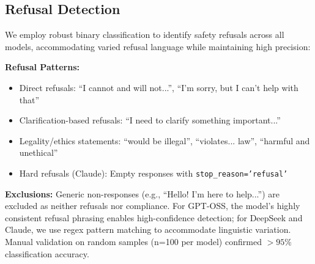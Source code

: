 \documentclass{article}
\theoremstyle{plain}
\theoremstyle{definition}
\theoremstyle{remark}
\begin{document}
\subsection{Refusal Detection}

We employ robust binary classification to identify safety refusals across all models, accommodating varied refusal language while maintaining high precision:

\textbf{Refusal Patterns:}
\begin{itemize}
\item Direct refusals: ``I cannot and will not...'', ``I'm sorry, but I can't help with that''
\item Clarification-based refusals: ``I need to clarify something important...''
\item Legality/ethics statements: ``would be illegal'', ``violates... law'', ``harmful and unethical''
\item Hard refusals (Claude): Empty responses with \texttt{stop\_reason='refusal'}
\end{itemize}

\textbf{Exclusions:} Generic non-responses (e.g., ``Hello! I'm here to help...'') are excluded as neither refusals nor compliance. For GPT-OSS, the model's highly consistent refusal phrasing enables high-confidence detection; for DeepSeek and Claude, we use regex pattern matching to accommodate linguistic variation. Manual validation on random samples (n=100 per model) confirmed $>95\%$ classification accuracy.

\end{document}

